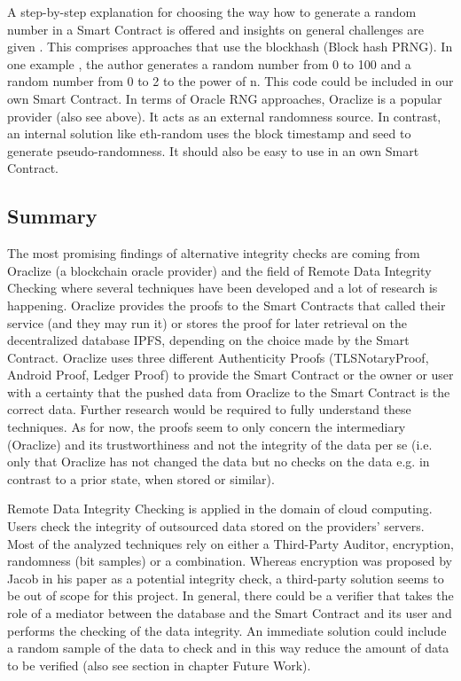 A step-by-step explanation for choosing the way how to generate a random number in a Smart Contract is offered and insights on general challenges are given \autocite{relatedWork25}. This comprises approaches that use the blockhash (Block hash PRNG).
In one example \autocite{relatedWork26}, the author generates a random number from 0 to 100 and a random number from 0 to 2 to the power of n. This code could be included in our own Smart Contract.
In terms of Oracle RNG approaches, Oraclize \autocite{relatedWork07} is a popular provider (also see above). It acts as an external randomness source.
In contrast, an internal solution like eth-random \autocite{relatedWork27} uses the block timestamp and seed to generate pseudo-randomness. It should also be easy to use in an own Smart Contract.

\subsection{Summary}
The most promising findings of alternative integrity checks are coming from Oraclize (a blockchain oracle provider) and the field of Remote Data Integrity Checking where several techniques have been developed and a lot of research is happening.
Oraclize provides the proofs to the Smart Contracts that called their service (and they may run it) or stores the proof for later retrieval on the decentralized database IPFS, depending on the choice made by the Smart Contract. Oraclize uses three different Authenticity Proofs (TLSNotaryProof, Android Proof, Ledger Proof) to provide the Smart Contract or the owner or user with a certainty that the pushed data from Oraclize to the Smart Contract is the correct data. Further research would be required to fully understand these techniques. As for now, the proofs seem to only concern the intermediary (Oraclize) and its trustworthiness and not the integrity of the data per se (i.e. only that Oraclize has not changed the data but no checks on the data e.g. in contrast to a prior state, when stored or similar).

Remote Data Integrity Checking is applied in the domain of cloud computing. Users check the integrity of outsourced data stored on the providers’ servers. Most of the analyzed techniques rely on either a Third-Party Auditor, encryption, randomness (bit samples) or a combination. Whereas encryption was proposed by Jacob in his paper as a potential integrity check, a third-party solution seems to be out of scope for this project. In general, there could be a verifier that takes the role of a mediator between the database and the Smart Contract and its user and performs the checking of the data integrity. An immediate solution could include a random sample of the data to check and in this way reduce the amount of data to be verified (also see section in chapter Future Work).

